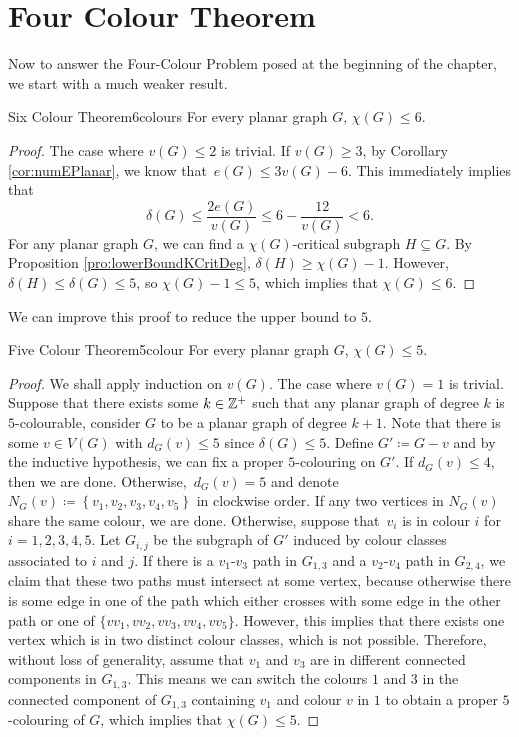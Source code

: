 \documentclass[math]{amznotes}
\theoremstyle{remark}
\newcommand{\0}{\mathbf{0}}
\newcommand{\1}{\mathbf{1}}
\begin{document}
\section{Four Colour Theorem}
Now to answer the Four-Colour Problem posed at the beginning of the chapter, we start with a much weaker result.
\begin{thmbox}{Six Colour Theorem}{6colours}
    For every planar graph $G$, $\chi(G) \leq 6$.
    \tcblower
    \begin{proof}
        The case where $v(G) \leq 2$ is trivial. If $v(G) \geq 3$, by Corollary \ref{cor:numEPlanar}, we know that~$e(G) \leq 3v(G) - 6$. This immediately implies that 
        \begin{equation*}
            \delta(G) \leq \frac{2e(G)}{v(G)} \leq 6 - \frac{12}{v(G)} < 6.
        \end{equation*}
        For any planar graph $G$, we can find a $\chi(G)$-critical subgraph $H \subseteq G$. By Proposition \ref{pro:lowerBoundKCritDeg}, $\delta(H) \geq \chi(G) - 1$. However, $\delta(H) \leq \delta(G) \leq 5$, so $\chi(G) - 1 \leq 5$, which implies that $\chi(G) \leq 6$.
    \end{proof}
\end{thmbox}
We can improve this proof to reduce the upper bound to $5$.
\begin{thmbox}{Five Colour Theorem}{5colour}
    For every planar graph $G$, $\chi(G) \leq 5$.
    \tcblower
    \begin{proof}
        We shall apply induction on $v(G)$. The case where $v(G) = 1$ is trivial. Suppose that there exists some $k \in \mathbb{Z}^+$ such that any planar graph of degree $k$ is $5$-colourable, consider $G$ to be a planar graph of degree $k + 1$. Note that there is some $v \in V(G)$ with $d_G(v) \leq 5$ since $\delta(G) \leq 5$. Define $G' \coloneqq G - v$ and by the inductive hypothesis, we can fix a proper $5$-colouring on $G'$. If $d_G(v) \leq 4$, then we are done. Otherwise,~$d_G(v) = 5$ and denote $N_G(v) \coloneqq \left\{v_1, v_2, v_3, v_4, v_5\right\}$ in clockwise order. If any two vertices in $N_G(v)$ share the same colour, we are done. Otherwise, suppose that~$v_i$ is in colour $i$ for $i = 1, 2, 3, 4, 5$. Let $G_{i, j}$ be the subgraph of $G'$ induced by colour classes associated to $i$ and $j$. If there is a $v_1$-$v_3$ path in $G_{1, 3}$ and a $v_2$-$v_4$ path in $G_{2, 4}$, we claim that these two paths must intersect at some vertex, because otherwise there is some edge in one of the path which either crosses with some edge in the other path or one of $\{vv_1, vv_2, vv_3, vv_4, vv_5\}$. However, this implies that there exists one vertex which is in two distinct colour classes, which is not possible. Therefore, without loss of generality, assume that $v_1$ and $v_3$ are in different connected components in $G_{1, 3}$. This means we can switch the colours $1$ and $3$ in the connected component of $G_{1, 3}$ containing $v_1$ and colour $v$ in $1$ to obtain a proper $5$-colouring of $G$, which implies that $\chi(G) \leq 5$.
    \end{proof}
\end{thmbox}
\end{document}
